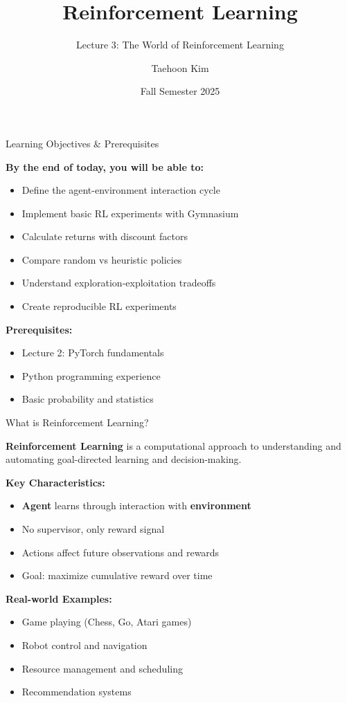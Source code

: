 \documentclass[aspectratio=169,10pt]{beamer}
\title{Reinforcement Learning}
\subtitle{Lecture 3: The World of Reinforcement Learning}
\author{Taehoon Kim}
\institute{Sogang University MIMIC Lab \\ \url{https://mimic-lab.com}}
\date{Fall Semester 2025}
\begin{document}
\begin{frame}[plain]
    \titlepage
\end{frame}

\begin{frame}{Learning Objectives \& Prerequisites}

\textbf{By the end of today, you will be able to:}
\begin{itemize}
    \item Define the agent-environment interaction cycle
    \item Implement basic RL experiments with Gymnasium
    \item Calculate returns with discount factors
    \item Compare random vs heuristic policies
    \item Understand exploration-exploitation tradeoffs
    \item Create reproducible RL experiments
\end{itemize}

\vfill

\textbf{Prerequisites:}
\begin{itemize}
    \item Lecture 2: PyTorch fundamentals
    \item Python programming experience
    \item Basic probability and statistics
\end{itemize}

\end{frame}

\begin{frame}{What is Reinforcement Learning?}

\textbf{Reinforcement Learning} is a computational approach to understanding and automating goal-directed learning and decision-making.

\vfill

\textbf{Key Characteristics:}
\begin{itemize}
    \item \textbf{Agent} learns through interaction with \textbf{environment}
    \item No supervisor, only reward signal
    \item Actions affect future observations and rewards
    \item Goal: maximize cumulative reward over time
\end{itemize}

\vfill

\textbf{Real-world Examples:}
\begin{itemize}
    \item Game playing (Chess, Go, Atari games)
    \item Robot control and navigation
    \item Resource management and scheduling
    \item Recommendation systems
\end{itemize}

\end{frame}
\end{document}
